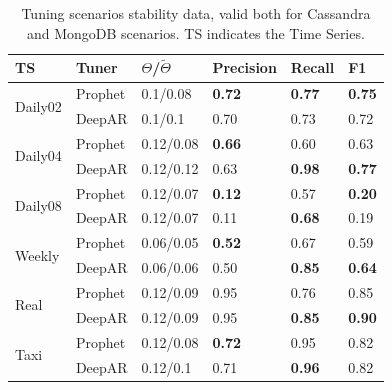 \documentclass[a4paper, 12pt]{article} %
\newcommand{\ra}[1]{\renewcommand{\arraystretch}{#1}}
\begin{document}
	\begin{table}\centering 
		\ra{1.3}
		\begin{tabularx}{\textwidth}{@{}XXXXXX@{}}
			\toprule
			TS & Tuner & $\Theta$/$\tilde{\Theta}$ & Precision & Recall& F1\\
			
			\midrule
			\multirow{2}{*}{Daily02}
			&Prophet & 0.1/0.08 & \textbf{0.72} & \textbf{0.77} & \textbf{0.75} \\
			&DeepAR & 0.1/0.1 & 0.70 & 0.73 & 0.72\\
			
			\midrule
			\multirow{2}{*}{Daily04}
			&Prophet & 0.12/0.08 & \textbf{0.66} & 0.60 & 0.63\\
			&DeepAR & 0.12/0.12 & 0.63 & \textbf{0.98} & \textbf{0.77}\\
			
			\midrule
			\multirow{2}{*}{Daily08}
			&Prophet & 0.12/0.07 & \textbf{0.12} & 0.57 & \textbf{0.20} \\
			&DeepAR & 0.12/0.07 & 0.11 & \textbf{0.68} & 0.19\\
			
			\midrule
			\multirow{2}{*}{Weekly}
			&Prophet & 0.06/0.05 & \textbf{0.52} & 0.67 & 0.59\\
			&DeepAR & 0.06/0.06 & 0.50 & \textbf{0.85} & \textbf{0.64}\\
			
			\midrule
			\multirow{2}{*}{Real}
			&Prophet & 0.12/0.09 & 0.95 & 0.76 & 0.85\\
			&DeepAR & 0.12/0.09 & 0.95 & \textbf{0.85} & \textbf{0.90} \\
			
			\midrule
			\multirow{2}{*}{Taxi}
			&Prophet & 0.12/0.08 & \textbf{0.72} & 0.95 & 0.82 \\
			&DeepAR & 0.12/0.1 & 0.71 & \textbf{0.96} & 0.82\\
			
			\bottomrule
		\end{tabularx}
		\caption{Tuning scenarios stability data, valid both for Cassandra and MongoDB scenarios. TS indicates the Time Series.} \label{table:results_stability}
	\end{table}
	
\end{document}
